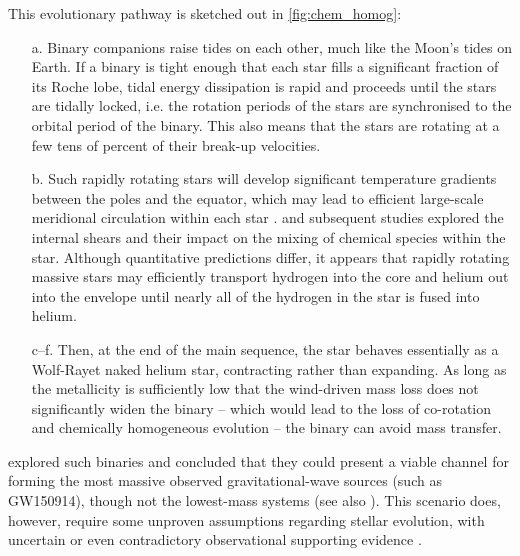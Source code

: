 \documentclass[review]{elsarticle}
\begin{document}
This evolutionary pathway is sketched out in \autoref{fig:chem_homog}:
\begin{itemize}
\item[a.] Binary companions raise tides on each other, much like the Moon's tides on Earth.  If a binary is tight enough that each star fills a significant fraction of its Roche lobe, tidal energy dissipation is rapid and proceeds until the stars are tidally locked, i.e. the rotation periods of the stars are synchronised to the orbital period of the binary. This also means that the stars are rotating at a few tens of percent of their break-up velocities.  
\item[b.] Such rapidly rotating stars will develop significant temperature gradients between the poles and the equator, which may lead to efficient large-scale meridional circulation within each star \citep{Eddington:1925,Sweet:1950}.  \citet{EndalSofia:1978} and subsequent studies \citep[e.g.,][]{Heger:2000,MaederMeynet:2000,Yoon:2006,Szecsi:2015} explored the internal shears and their impact on the mixing of chemical species within the star.  Although quantitative predictions differ, it appears that rapidly rotating massive stars may efficiently transport hydrogen into the core and helium out into the envelope until nearly all of the hydrogen in the star is fused into helium.  
\item[c--f.] Then, at the end of the main sequence, the star behaves essentially as a Wolf-Rayet naked helium star, contracting rather than expanding. As long as the metallicity is sufficiently low that the wind-driven mass loss does not significantly widen the binary -- which would lead to the loss of co-rotation and chemically homogeneous evolution \citep{deMink:2009} -- the binary can avoid mass transfer.  
\end{itemize}

\citet{MandeldeMink:2016,Marchant:2016,deMinkMandel:2016} explored such binaries and concluded that they could present a viable channel for forming the most massive observed gravitational-wave sources (such as GW150914), though not the lowest-mass systems (see also \cite{duBoisson:2020,Riley:2020}).  This scenario does, however, require some unproven assumptions regarding stellar evolution, with uncertain or even contradictory observational supporting evidence \citep{Almeida:2015, AbdulMasih:2021}.
\end{document}
